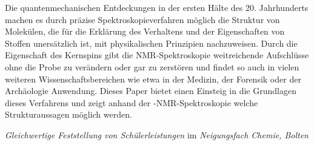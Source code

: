 Die quantenmechanischen Entdeckungen in der ersten Hälte des 20. Jahrhunderts machen es durch präzise Spektroskopieverfahren möglich die Struktur von Molekülen, die für die Erklärung des Verhaltens und der Eigenschaften von Stoffen unersätzlich ist, mit physikalischen Prinzipien nachzuweisen. Durch die Eigenschaft des Kernspins gibt die NMR-Spektroskopie weitreichende Aufschlüsse ohne die Probe zu verändern oder gar zu zerstören und findet so auch in vielen weiteren Wissenschaftsbereichen wie etwa in der Medizin, der Forensik oder der Archäologie Anwendung. Dieses Paper bietet einen Einsteig in die Grundlagen dieses Verfahrens und zeigt anhand der -NMR-Spektroskopie welche Strukturaussagen möglich werden.

\emph{Gleichwertige Feststellung von Schülerleistungen} im \emph{Neigungsfach Chemie, Bolten}
